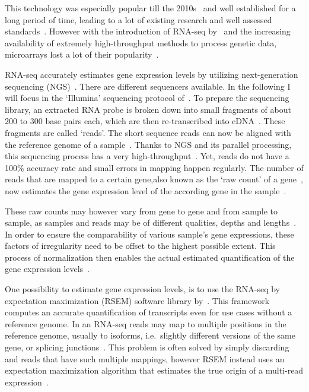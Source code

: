 This technology was especially popular till the 2010s~\citep{guo13} and well established for a long period of time,
leading to a lot of existing research and well assessed standards~\citep{malone}.
However with the introduction of RNA-seq by~\cite{wang09} and the increasing availability
of extremely high-throughput methods to process genetic data, microarrays lost a lot of their popularity~\citep{malone, li09}.

RNA-seq accurately estimates gene expression levels by utilizing next-generation sequencing (NGS)~\citep{guo13}.
There are different sequencers available. In the following I will focus in the `Illumina' sequencing protocol of~\cite{wang09}.
To prepare the sequencing library, an extracted RNA probe is broken down into small fragments of about 200 to 300 base pairs each,
which are then re-transcribed into cDNA~\citep{marguerat, wang09}.
These fragments are called `reads'.
The short sequence reads can now be aligned with the reference genome of a sample~\citep{li09}.
Thanks to NGS and its parallel processing, this sequencing process has a very high-throughput~\citep{franchis}.
Yet, reads do not have a 100\% accuracy rate and small errors in mapping happen regularly.
The number of reads that are mapped to a certain gene,also known as the `raw count' of a gene~\citep{li11}, now
estimates the gene expression level of the according gene in the sample~\citep{marguerat, wang09}.

These raw counts may however vary from gene to gene and from sample to sample, as
samples and reads may be of different qualities, depths and lengths~\citep{li11, zhao, guo13}.
In order to ensure the comparability of various sample's gene expressions, these factors of irregularity
need to be offset to the highest possible extent.
This process of normalization then enables the actual estimated quantification of the gene expression levels~\citep{zhao}.

One possibility to estimate gene expression levels, is to use the RNA-seq by expectation maximization (RSEM) software library by~\cite{li11}.
This framework computes an accurate quantification of transcripts even for use cases without a reference genome.
In an RNA-seq reads may map to multiple positions in the reference genome,
usually to isoforms, i.e.\ slightly different versions of the same gene, or splicing junctions~\citep{li09}.
This problem is often solved by simply discarding and reads that have such multiple mappings,
however RSEM instead uses an expectation maximization algorithm that estimates the
true origin of a multi-read expression~\citep{li11}.

